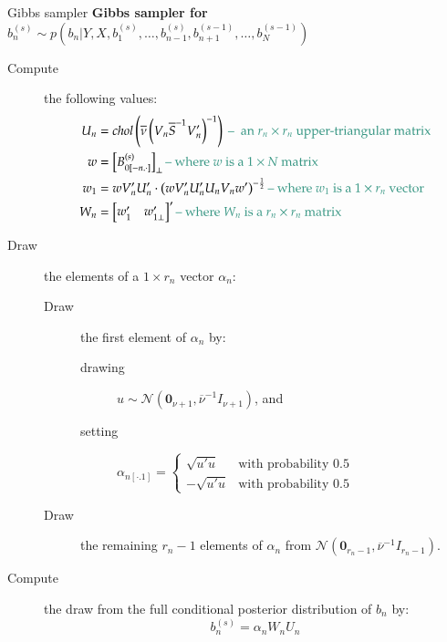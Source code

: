 \documentclass[notes,blackandwhite,mathsans,usenames,dvipsnames]{beamer}
\begin{document}
\begin{frame}{Gibbs sampler}
\footnotesize
\bigskip\textbf{Gibbs sampler for $b_n^{(s)}\sim p\left(b_n|Y,X,b_1^{(s)},\dots,b_{n-1}^{(s)},b_{n+1}^{(s-1)},\dots,b_N^{(s-1)}\right)$}
\begin{description}
\item[Compute] the following values:
\begin{align*}
U_n &= chol\left(\overline{\nu} \left(V_n\overline{S}^{-1}V_n'\right)^{-1}\right) {\color{mcxs2}\text{ -- } \text{ an } r_n\times r_n\text{ upper-triangular matrix}}\\
w &= \left[B_{0[-n.\cdot]}^{(s)}\right]_{\bot} {\color{mcxs2}\text{-- where } w \text{ is a }1\times N \text{ matrix}} \\
w_1 &= wV_n'U_n' \cdot \left( wV_n'U_n' U_n V_nw' \right)^{-\frac{1}{2}} {\color{mcxs2}\text{-- where } w_1 \text{ is a } 1\times r_n \text{ vector}}\\
W_n &= \begin{bmatrix}w_1' & w_{1\bot}'\end{bmatrix}' {\color{mcxs2}\text{-- where } W_n \text{ is a } r_n\times r_n \text{ matrix}}
\end{align*}

\item[Draw] the elements of a $1\times r_n$ vector $\alpha_n$:
	\begin{description}
	\item[Draw] the first element of $\alpha_n$ by: 
		\begin{description}
		\item[drawing] $u\sim\mathcal{N}\left( \mathbf{0}_{\nu+1}, \overline{\nu}^{-1}I_{\nu+1} \right)$, and
		\item[setting] $\alpha_{n[\cdot.1]}= \left\{ \begin{array}{ll} \sqrt{u'u} & \text{with probability } 0.5 \\ -\sqrt{u'u} & \text{with probability } 0.5 \end{array} \right.$
		\end{description}
		\item[Draw] the remaining $r_n-1$ elements of $\alpha_n$ from $\mathcal{N}\left( \mathbf{0}_{r_n-1}, \overline{\nu}^{-1}I_{r_n-1} \right)$.
	\end{description}
\item[Compute] the draw from the full conditional posterior distribution of $b_n$ by:
$$ b_n^{(s)} = \alpha_n W_n U_n$$
\end{description}
\end{frame}
\end{document}
